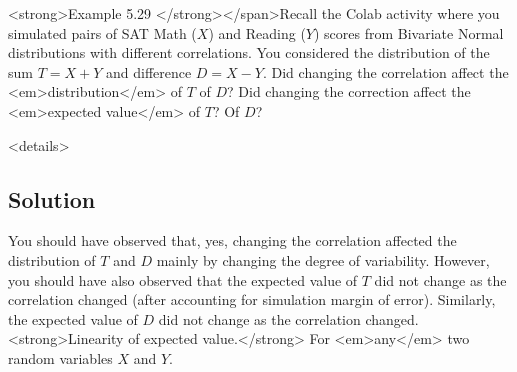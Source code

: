 
<strong>Example 5.29  </strong></span>Recall the Colab activity where you simulated pairs of SAT Math ($ {\displaystyle X} $) and Reading ($ {\displaystyle Y} $) scores from Bivariate Normal distributions with different correlations. You considered the distribution of the sum $ {\displaystyle T=X+Y} $ and difference $ {\displaystyle D= X - Y} $. Did changing the correlation affect the <em>distribution</em> of $ {\displaystyle T} $ of $ {\displaystyle D} $? Did changing the correction affect the <em>expected value</em> of $ {\displaystyle T} $? Of $ {\displaystyle D} $?

<details>
\subsection*{Solution}
You should have observed that, yes, changing the correlation affected the distribution of $ {\displaystyle T} $ and $ {\displaystyle D} $ mainly by changing the degree of variability. 
However, you should have also observed that the expected value of $ {\displaystyle T} $ did not change as the correlation changed (after accounting for simulation margin of error). Similarly, the expected value of $ {\displaystyle D} $ did not change as the correlation changed.
<strong>Linearity of expected value.</strong> For <em>any</em> two random variables $ {\displaystyle X} $ and $ {\displaystyle Y} $.
